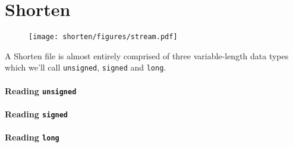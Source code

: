 
\chapter{Shorten}
\begin{figure}[h]
\texttt{[image: shorten/figures/stream.pdf]}
\end{figure}
A Shorten file is almost entirely comprised of three variable-length
data types which we'll call \texttt{unsigned}, \texttt{signed} and
\texttt{long}.
\subsubsection{Reading \texttt{unsigned}}
\label{shorten:read_unsigned}
{
  
}
\subsubsection{Reading \texttt{signed}}
\label{shorten:read_signed}
{
  
}
\subsubsection{Reading \texttt{long}}
\label{shorten:read_long}
{
  
}

\clearpage



\clearpage


